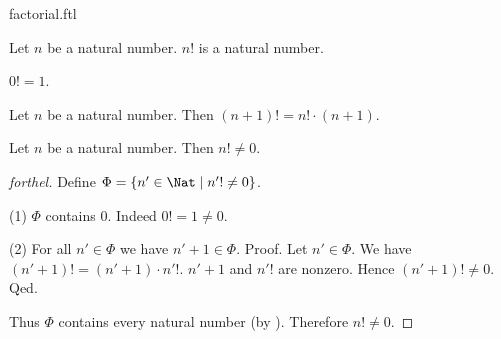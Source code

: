 \documentclass{naproche-library}
\begin{document}
\begin{smodule}[title=Factorial]{factorial.ftl}

\begin{signature}[forthel,id=ARITHMETIC_12_0210357812531785]
  Let $n$ be a natural number.
  $n!$ is a natural number.
\end{signature}

\begin{axiom}[forthel,id=ARITHMETIC_12_6945210541236989]
  $0! = 1$.
\end{axiom}

\begin{axiom}[forthel,id=ARITHMETIC_12_2312015846987452]
  Let $n$ be a natural number.
  Then $(n + 1)! = n! \cdot (n + 1)$.
\end{axiom}

\begin{proposition}[forthel,id=ARITHMETIC_12_6123519005949952]
  Let $n$ be a natural number.
  Then $n! \neq 0$.
\end{proposition}
\begin{proof}[forthel]
  Define $\Phi = \{n' \in \Nat \mid n'! \neq 0 \}$.

  (1) $\Phi$ contains $0$.
  Indeed $0! = 1 \neq 0$.

  (2) For all $n' \in \Phi$ we have $n' + 1 \in \Phi$. \newline
  Proof.
    Let $n' \in \Phi$.
    We have $(n' + 1)! = (n' + 1) \cdot n'!$.
    $n' + 1$ and $n'!$ are nonzero.
    Hence $(n' + 1)! \neq 0$.
  Qed.

  Thus $\Phi$ contains every natural number (by ).
  Therefore $n! \neq 0$.
\end{proof}
\end{smodule}
\end{document}
